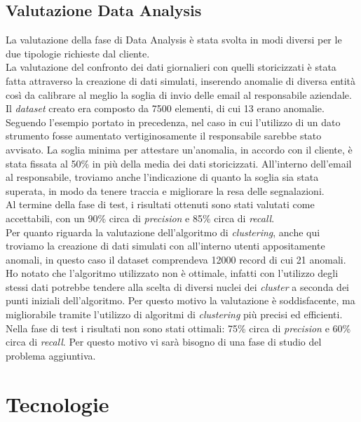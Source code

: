 \subsection{Valutazione Data Analysis}
La valutazione della fase di Data Analysis è stata svolta in modi diversi per le due tipologie richieste dal cliente.
\\
La valutazione del confronto dei dati giornalieri con quelli storicizzati è stata fatta attraverso la creazione di dati simulati, inserendo anomalie di diversa entità così da calibrare al meglio la soglia di invio delle email al responsabile aziendale. Il \emph{dataset} creato era composto da 7500 elementi, di cui 13 erano anomalie.
\\
Seguendo l'esempio portato in precedenza, nel caso in cui l'utilizzo di un dato strumento fosse aumentato vertiginosamente il responsabile sarebbe stato avvisato. La soglia minima per attestare un'anomalia, in accordo con il cliente, è stata fissata al 50\% in più della media dei dati storicizzati. All'interno dell'email al responsabile, troviamo anche l'indicazione di quanto la soglia sia stata superata, in modo da tenere traccia e migliorare la resa delle segnalazioni.
\\
Al termine della fase di test, i risultati ottenuti sono stati valutati come accettabili, con un 90\% circa di \emph{precision} e 85\% circa di \emph{recall}.
\\
Per quanto riguarda la valutazione dell'algoritmo di \emph{clustering}, anche qui troviamo la creazione di dati simulati con all'interno utenti appositamente anomali, in questo caso il dataset comprendeva 12000 record di cui 21 anomali. Ho notato che l'algoritmo utilizzato non è ottimale, infatti con l'utilizzo degli stessi dati potrebbe tendere alla scelta di diversi nuclei dei \emph{cluster} a seconda dei punti iniziali dell'algoritmo. Per questo motivo la valutazione è soddisfacente, ma migliorabile tramite l'utilizzo di algoritmi di \emph{clustering} più precisi ed efficienti. Nella fase di test i risultati non sono stati ottimali: 75\% circa di \emph{precision} e 60\% circa di \emph{recall}. Per questo motivo vi sarà bisogno di una fase di studio del problema aggiuntiva.

\section{Tecnologie}
